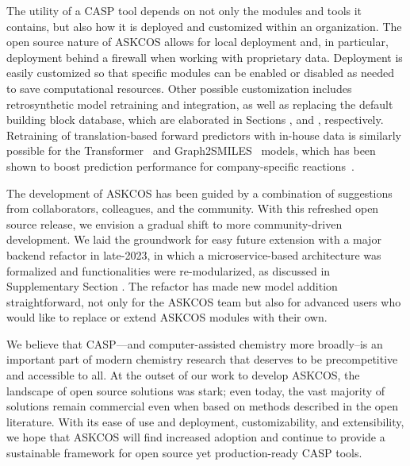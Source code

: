 \documentclass[pdflatex,sn-mathphys-num]{sn-jnl}%
\theoremstyle{thmstyleone}%
\theoremstyle{thmstyletwo}%
\theoremstyle{thmstylethree}%
\begin{document}

The utility of a CASP tool depends on not only the modules and tools it contains, but also how it is deployed and customized within an organization. The open source nature of ASKCOS allows for local deployment and, in particular, deployment behind a firewall when working with proprietary data. Deployment is easily customized so that specific modules can be enabled or disabled as needed to save computational resources. Other possible customization includes retrosynthetic model retraining and integration, as well as replacing the default building block database, which are elaborated in Sections , and , respectively. Retraining of translation-based forward predictors with in-house data is similarly possible for the Transformer~\citep{tetko_state---art_2020} and Graph2SMILES~\citep{tu_permutation_2022} models, which has been shown to boost prediction performance for company-specific reactions~\citep{lee_molecular_2019}.


The development of ASKCOS has been guided by a combination of suggestions from collaborators, colleagues, and the community. With this refreshed open source release, we envision a gradual shift to more community-driven development. We laid the groundwork for easy future extension with a major backend refactor in late-2023, in which a microservice-based architecture was formalized and functionalities were re-modularized, as discussed in Supplementary Section . The refactor has made new model addition straightforward, not only for the ASKCOS team but also for advanced users who would like to replace or extend ASKCOS modules with their own. 


We believe that CASP---and computer-assisted chemistry more broadly--is an important part of modern chemistry research that deserves to be precompetitive and accessible to all. At the outset of our work to develop ASKCOS, the landscape of open source solutions was stark; even today, the vast majority of solutions remain commercial even when based on methods described in the open literature. With its ease of use and deployment, customizability, and extensibility, we hope that ASKCOS will find increased adoption and continue to provide a sustainable framework for open source yet production-ready CASP tools.
\end{document}
